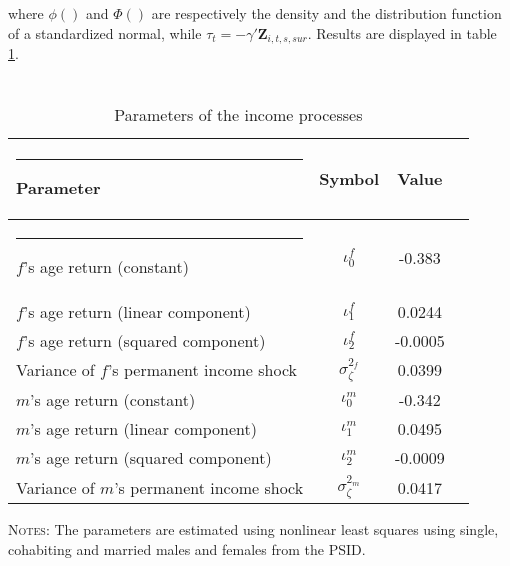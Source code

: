 \documentclass[12pt]{article}
\numberwithin{table}{section}
\begin{document}
where $\phi()$ and $\Phi()$ are respectively the density and the distribution function of a standardized normal,  while $\tau_t=-\gamma'\mathbf{Z}_{i,t,s,sur}$. Results are displayed in table \ref{table:income_params}.

\begin{table}[H]
\caption{\\Parameters of the income processes} %
\centering %
\begin{threeparttable}
\begin{tabular}{@{\extracolsep{5pt}}lccc}   %
\hline \hline%
\rule{-4pt}{2.5ex}
Parameter & Symbol  & Value \\ [0.45ex] %
\hline
\rule{-4pt}{2.5ex}
$f$'s age return (constant)         & $\iota^f_0$  & -0.383 &  \\[0.45ex]
$f$'s age return (linear component) & $\iota^f_1$         & 0.0244  & \\[0.45ex]
$f$'s age return (squared component)               & $\iota^f_2$       & -0.0005 &  \\[0.45ex]
Variance of $f$'s permanent income shock                                 & $\sigma_\zeta^{2_f}$             & 0.0399  &  \\[0.45ex]
$m$'s age return (constant)         & $\iota^m_0$  & -0.342 &\\[0.45ex]
$m$'s age return (linear component) & $\iota^m_1$         & 0.0495  &  \\[0.45ex]
$m$'s age return (squared component)               & $\iota^m_2$       & -0.0009 &  \\[0.45ex]
Variance of $m$'s permanent income shock                                 & $\sigma_\zeta^{2_m}$             & 0.0417  &  \\[0.45ex]
\hline
\end{tabular}
\begin{tablenotes}[flushleft]
\footnotesize{\item \textsc{Notes}: The parameters are estimated using nonlinear least squares using single, cohabiting and married males and females from the PSID. }
\end{tablenotes}
\end{threeparttable}
\label{table:income_params}
\end{table}
\FloatBarrier
\end{document}
